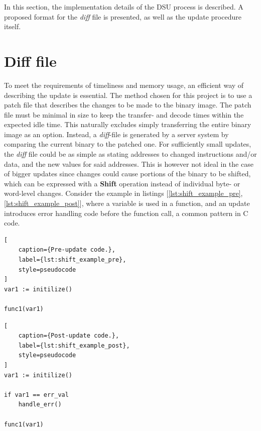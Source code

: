In this section, the implementation details of the DSU process is described. A proposed format for the \textit{diff} file is presented, as well as the update procedure itself. 
\section{Diff file}\label{sec:patchfile}
To meet the requirements of timeliness and memory usage, an efficient way of describing the update is essential. The method chosen for this project is to use a patch file that describes the changes to be made to the binary image.
The patch file must be minimal in size to keep the transfer- and decode times within the expected idle time. This naturally excludes simply transferring the entire binary image as an option. Instead, a \textit{\textit{diff}}-file is generated by a server system by comparing the current binary to the patched one. For sufficiently small updates, the \textit{diff} file could be as simple as stating addresses to changed instructions and/or data, and the new values for said addresses. This is however not ideal in the case of bigger updates since changes could cause portions of the binary to be shifted, which can be expressed with a \textbf{Shift} operation instead of individual byte- or word-level changes. Consider the example in listings [\ref{lst:shift_example_pre}, \ref{lst:shift_example_post}], where a variable is used in a function, and an update introduces error handling code before the function call, a common pattern in C code.

\begin{framed}
\noindent\begin{minipage}{0.45\textwidth}
\begin{lstlisting}[
    caption={Pre-update code.},
    label={lst:shift_example_pre},
    style=pseudocode
]
var1 := initilize()

func1(var1)
\end{lstlisting}
\end{minipage}\hfill
\noindent\begin{minipage}{0.45\textwidth}
\begin{lstlisting}[
    caption={Post-update code.},
    label={lst:shift_example_post},
    style=pseudocode
]
var1 := initilize()

if var1 == err_val
    handle_err()

func1(var1)
\end{lstlisting}
\end{minipage}
\end{framed}\hfill

